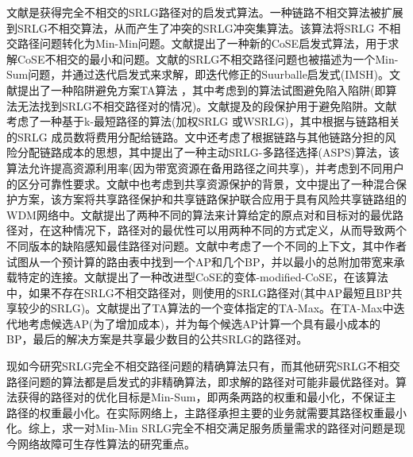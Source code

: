 文献\cite{rostami2007cose,todimala2004imsh,xu2003trap}是获得完全不相交的SRLG路径对的启发式算法。一种链路不相交算法被扩展到SRLG不相交算法\cite{rostami2007cose}，从而产生了冲突的SRLG冲突集算法。该算法将SRLG 不相交路径问题转化为Min-Min问题。文献\cite{gomes2010obtaining}提出了一种新的CoSE启发式算法，用于求解CoSE不相交的最小和问题。文献\cite{todimala2004imsh}的SRLG不相交路径问题也被描述为一个Min-Sum问题，并通过迭代启发式来求解，即迭代修正的Suurballe启发式(IMSH)。文献\cite{xu2003trap}提出了一种陷阱避免方案TA算法 ，其中考虑到的算法试图避免陷入陷阱(即算法无法找到SRLG不相交路径对的情况)。文献\cite{luo2007insights}提及的段保护用于避免陷阱。文献\cite{oki2002disjoint}考虑了一种基于k-最短路径的算法(加权SRLG 或WSRLG)，其中根据与链路相关的SRLG 成员数将费用分配给链路。文中还考虑了根据链路与其他链路分担的风险分配链路成本的思想，其中提出了一种主动SRLG-多路径选择(ASPS)算法，该算法允许提高资源利用率(因为带宽资源在备用路径之间共享)，并考虑到不同用户的区分可靠性要求。文献\cite{pan2006heuristics}中也考虑到共享资源保护的背景，文中提出了一种混合保护方案，该方案将共享路径保护和共享链路保护联合应用于具有风险共享链路组的WDM网络中。文献\cite{wang2007impairment}提出了两种不同的算法来计算给定的原点对和目标对的最优路径对，在这种情况下，路径对的最优性可以用两种不同的方式定义，从而导致两个不同版本的缺陷感知最佳路径对问题。文献\cite{cheng2007multiple}中考虑了一个不同的上下文，其中作者试图从一个预计算的路由表中找到一个AP和几个BP，并以最小的总附加带宽来承载特定的连接。文献\cite{rostami2007cose}提出了一种改进型CoSE的变体-modified-CoSE，在该算法中，如果不存在SRLG不相交路径对，则使用的SRLG路径对(其中AP最短且BP共享较少的SRLG)。文献\cite{silva2011heuristic}提出了TA算法\cite{xu2003trap}的一个变体指定的TA-Max。在TA-Max中迭代地考虑候选AP(为了增加成本)，并为每个候选AP计算一个具有最小成本的BP，最后的解决方案是共享最少数目的公共SRLG的路径对。


现如今研究SRLG完全不相交路径问题的精确算法只有\cite{rostami2007cose,hu2003diverse,todimala2004imsh}，而其他研究SRLG不相交路径问题的算法\cite{xu2003trap}都是启发式的非精确算法，即求解的路径对可能非最优路径对。算法\cite{todimala2004imsh}获得的路径对的优化目标是Min-Sum，即两条两路的权重和最小化，不保证主路径的权重最小化。在实际网络上，主路径承担主要的业务就需要其路径权重最小化。综上，求一对Min-Min SRLG完全不相交满足服务质量需求的路径对问题是现今网络故障可生存性算法的研究重点。

